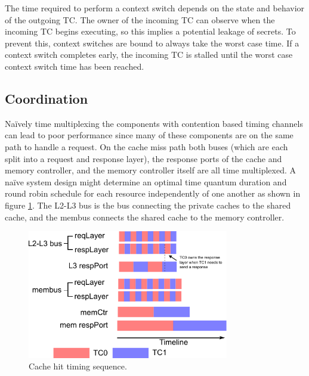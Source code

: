 The time required to perform a context switch depends on the state and behavior 
of the outgoing TC. The owner of the incoming TC can observe when the incoming 
TC begins executing, so this implies a potential leakage of secrets.  To 
prevent this, context switches are bound to always take the worst case time.  
If a context switch completes early, the incoming TC is stalled until the worst 
case context switch time has been reached.

\subsection{Coordination}
Naïvely time multiplexing the components with contention based timing channels 
can lead to poor performance since many of these components are on the same 
path to handle a request. 
On the cache miss path both buses (which are each split into a request and 
response layer), the response ports of the cache and memory controller, and the 
memory controller itself are all time multiplexed. A naïve system design might 
determine an optimal time quantum duration and round robin schedule for each 
resource independently of one another as shown in figure 
\ref{fig:naive_scheme}. The L2-L3 bus is the bus connecting the private caches 
to the shared cache, and the membus connects the shared cache to the memory 
controller.

\begin{figure}
    \begin{center}
        \includegraphics[width=3.46in]{figs/baseline_schedule.pdf}
        \caption{Cache hit timing sequence.}
        \label{fig:naive_scheme}
    \end{center}
\end{figure}

